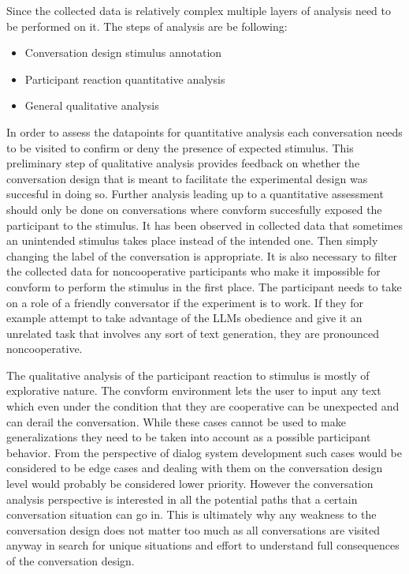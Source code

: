 \documentclass[12pt]{report}
\begin{document}
{Since the collected data is relatively complex
multiple layers of analysis need to be performed on it.
The steps of analysis are be following:

\begin{itemize}
\item{Conversation design stimulus annotation}
\item{Participant reaction quantitative analysis}
\item{General qualitative analysis}
\end{itemize}

In order to assess the datapoints for quantitative analysis
each conversation needs to be visited
to confirm or deny the presence of expected stimulus.
This preliminary step of qualitative analysis
provides feedback on whether the conversation design
that is meant to facilitate the experimental design
was succesful in doing so.
Further analysis leading up to a quantitative assessment
should only be done on conversations
where convform succesfully exposed the participant to the stimulus.
It has been observed in collected data
that sometimes an unintended stimulus
takes place instead of the intended one.
Then simply changing the label of the conversation is appropriate.
It is also necessary to filter the collected data for
noncooperative participants who make it impossible for convform
to perform the stimulus in the first place.
The participant needs to take on a role of a friendly conversator
if the experiment is to work.
If they for example attempt to take advantage of the LLMs obedience
and give it an unrelated task that involves any sort of text generation,
they are pronounced noncooperative.

The qualitative analysis of the participant reaction to stimulus
is mostly of explorative nature.
The convform environment lets the user to input any text
which even under the condition that they are cooperative
can be unexpected and can derail the conversation.
While these cases cannot be used to make generalizations
they need to be taken into account
as a possible participant behavior.
From the perspective of dialog system development
such cases would be considered to be edge cases
and dealing with them on the conversation design level
would probably be considered lower priority.
However the conversation analysis perspective
is interested in all the potential paths that
a certain conversation situation can go in.
This is ultimately why any weakness to the conversation design
does not matter too much
as all conversations are visited anyway
in search for unique situations and effort to understand full consequences of the conversation design.

}
\end{document}
